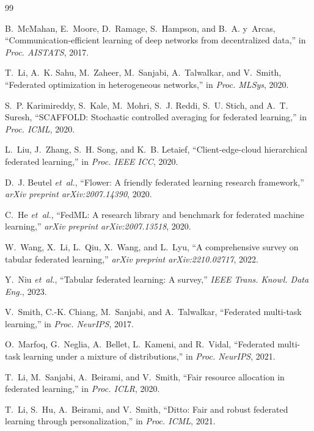 \documentclass[conference]{IEEEtran}
\begin{document}
\begin{thebibliography}{99}

B.~McMahan, E.~Moore, D.~Ramage, S.~Hampson, and B.~A. y~Arcas,
``Communication-efficient learning of deep networks from decentralized data,''
in \emph{Proc. AISTATS}, 2017.

T.~Li, A.~K. Sahu, M.~Zaheer, M.~Sanjabi, A.~Talwalkar, and V.~Smith,
``Federated optimization in heterogeneous networks,''
in \emph{Proc. MLSys}, 2020.

S.~P. Karimireddy, S.~Kale, M.~Mohri, S.~J. Reddi, S.~U. Stich, and A.~T. Suresh,
``SCAFFOLD: Stochastic controlled averaging for federated learning,''
in \emph{Proc. ICML}, 2020.

L.~Liu, J.~Zhang, S.~H. Song, and K.~B. Letaief,
``Client-edge-cloud hierarchical federated learning,''
in \emph{Proc. IEEE ICC}, 2020.

D.~J. Beutel \emph{et~al.},
``Flower: A friendly federated learning research framework,''
\emph{arXiv preprint arXiv:2007.14390}, 2020.

C.~He \emph{et~al.},
``FedML: A research library and benchmark for federated machine learning,''
\emph{arXiv preprint arXiv:2007.13518}, 2020.

W.~Wang, X.~Li, L.~Qiu, X.~Wang, and L.~Lyu,
``A comprehensive survey on tabular federated learning,''
\emph{arXiv preprint arXiv:2210.02717}, 2022.

Y.~Niu \emph{et~al.},
``Tabular federated learning: A survey,''
\emph{IEEE Trans. Knowl. Data Eng.}, 2023.

V.~Smith, C.-K. Chiang, M.~Sanjabi, and A.~Talwalkar,
``Federated multi-task learning,''
in \emph{Proc. NeurIPS}, 2017.

O.~Marfoq, G.~Neglia, A.~Bellet, L.~Kameni, and R.~Vidal,
``Federated multi-task learning under a mixture of distributions,''
in \emph{Proc. NeurIPS}, 2021.

T.~Li, M.~Sanjabi, A.~Beirami, and V.~Smith,
``Fair resource allocation in federated learning,''
in \emph{Proc. ICLR}, 2020.

T.~Li, S.~Hu, A.~Beirami, and V.~Smith,
``Ditto: Fair and robust federated learning through personalization,''
in \emph{Proc. ICML}, 2021.


\end{thebibliography}
\end{document}
